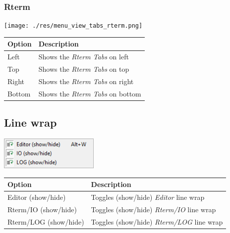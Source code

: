\hypertarget{menu_view_tabs_rterm}{}
\subsubsection{Rterm}

\texttt{[image: ./res/menu\_view\_tabs\_rterm.png]}\\

\begin{scriptsize}\begin{tabularx}{\textwidth}{>{\hsize=0.3\hsize}X>{\hsize=0.7\hsize}X}\\
    \hline
    \textbf{Option} & \textbf{Description} \\
    \hline
    Left & Shows the \textit{Rterm Tabs} on left \\
    Top & Shows the \textit{Rterm Tabs} on top \\
    Right & Shows the \textit{Rterm Tabs} on right \\
    Bottom & Shows the \textit{Rterm Tabs} on bottom \\
    \hline
  \end{tabularx}\end{scriptsize}


\hypertarget{menu_view_linewrap}{}
\subsection{Line wrap}

\includegraphics[scale=0.50]{./res/menu_view_linewrap.png}\\

\begin{scriptsize}\begin{tabularx}{\textwidth}{>{\hsize=0.3\hsize}X>{\hsize=0.7\hsize}X}\\
    \hline
    \textbf{Option} & \textbf{Description} \\
    \hline
    Editor (show/hide) & Toggles (show/hide) \textit{Editor} line wrap \\
    Rterm/IO (show/hide) & Toggles (show/hide) \textit{Rterm/IO} line wrap \\
    Rterm/LOG (show/hide) & Toggles (show/hide) \textit{Rterm/LOG} line wrap \\
    \hline
  \end{tabularx}\end{scriptsize}


